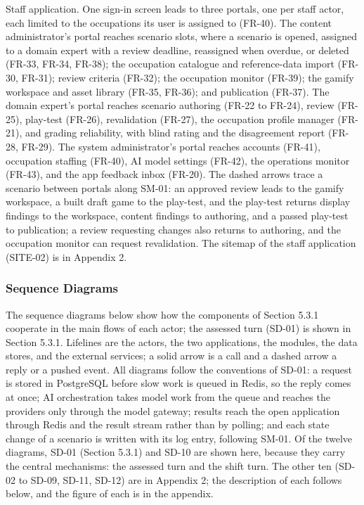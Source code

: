 Staff application. One sign-in screen leads to three portals, one per staff actor, each limited to the occupations its user is assigned to (FR-40). The content administrator's portal reaches scenario slots, where a scenario is opened, assigned to a domain expert with a review deadline, reassigned when overdue, or deleted (FR-33, FR-34, FR-38); the occupation catalogue and reference-\allowbreak{}data import (FR-30, FR-31); review criteria (FR-32); the occupation monitor (FR-39); the gamify workspace and asset library (FR-35, FR-36); and publication (FR-37). The domain expert's portal reaches scenario authoring (FR-22 to FR-24), review (FR-25), play-test (FR-26), revalidation (FR-27), the occupation profile manager (FR-21), and grading reliability, with blind rating and the disagreement report (FR-28, FR-29). The system administrator's portal reaches accounts (FR-41), occupation staffing (FR-40), AI model settings (FR-42), the operations monitor (FR-43), and the app feedback inbox (FR-20). The dashed arrows trace a scenario between portals along SM-01: an approved review leads to the gamify workspace, a built draft game to the play-test, and the play-test returns display findings to the workspace, content findings to authoring, and a passed play-test to publication; a review requesting changes also returns to authoring, and the occupation monitor can request revalidation. The sitemap of the staff application (SITE-02) is in Appendix 2.

\subsubsection{Sequence Diagrams}

The sequence diagrams below show how the components of Section 5.3.1 cooperate in the main flows of each actor; the assessed turn (SD-01) is shown in Section 5.3.1. Lifelines are the actors, the two applications, the modules, the data stores, and the external services; a solid arrow is a call and a dashed arrow a reply or a pushed event. All diagrams follow the conventions of SD-01: a request is stored in PostgreSQL before slow work is queued in Redis, so the reply comes at once; AI orchestration takes model work from the queue and reaches the providers only through the model gateway; results reach the open application through Redis and the result stream rather than by polling; and each state change of a scenario is written with its log entry, following SM-01. Of the twelve diagrams, SD-01 (Section 5.3.1) and SD-10 are shown here, because they carry the central mechanisms: the assessed turn and the shift turn. The other ten (SD-02 to SD-09, SD-11, SD-12) are in Appendix 2; the description of each follows below, and the figure of each is in the appendix.


